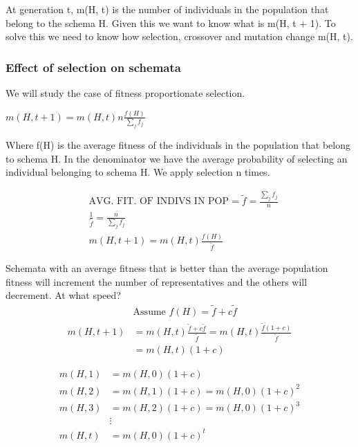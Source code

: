 \vspace{10pt}

At generation t, m(H, t) is the number of individuals in the population that belong to the schema H. Given this we want to know what is m(H, t + 1). To solve this we need to know how selection, crossover and mutation change m(H, t). 

\vspace{10pt}

\subsubsection{Effect of selection on schemata}

We will study the case of fitness proportionate selection. 

$m(H, t +1 ) = m(H, t) n \frac{f(H)}{\sum_{j}^{}f_j}$

Where f(H) is the average fitness of the individuals in the population that belong to schema H. In the denominator we have the average probability of selecting an individual belonging to schema H. We apply selection n times.

\vspace{10pt}
\[
\begin{aligned}
&\text{AVG. FIT. OF INDIVS IN POP} = \tilde{f} = \frac{\sum_{j} f_j}{n} \\
&\frac{1}{\tilde{f}} = \frac{n}{\sum_{j} f_j} \\
&m(H, t+1) = m(H, t) \frac{f(H)}{\tilde{f}}
\end{aligned}\]


\vspace{10pt}

Schemata with an average fitness that is better than the average population fitness will increment the number of representatives and the others will decrement. 
At what speed? 
\[
\begin{aligned}
&\text{Assume } f(H) = \tilde{f} + c\tilde{f} \\
m(H, t+1) &= m(H, t) \frac{\tilde{f} + c\tilde{f}}{\tilde{f}} = m(H, t) \frac{\tilde{f}(1+c)}{\tilde{f}} \\
&= m(H, t)(1+c)
\end{aligned}
\]

\[
\begin{aligned}
m(H, 1) &= m(H, 0)(1+c) \\
m(H, 2) &= m(H, 1)(1+c) = m(H, 0)(1+c)^2 \\
m(H, 3) &= m(H, 2)(1+c) = m(H, 0)(1+c)^3 \\
&\vdots \\
m(H, t) &= m(H, 0)(1+c)^t
\end{aligned} \]

